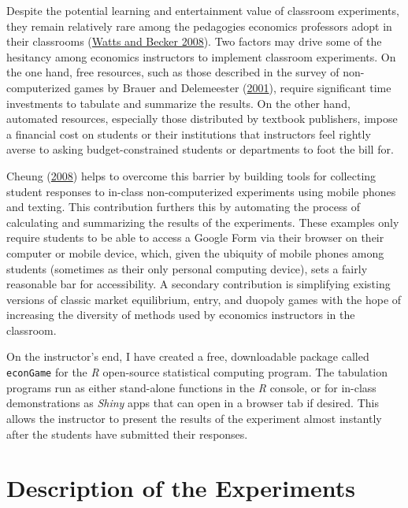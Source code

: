 \documentclass[
]{article}
\begin{document}
Despite the potential learning and entertainment value of classroom
experiments, they remain relatively rare among the pedagogies economics
professors adopt in their classrooms
(\protect\hyperlink{ref-watts_little_2008}{Watts and Becker 2008}). Two
factors may drive some of the hesitancy among economics instructors to
implement classroom experiments. On the one hand, free resources, such
as those described in the survey of non-computerized games by Brauer and
Delemeester (\protect\hyperlink{ref-brauer_games_2001}{2001}), require
significant time investments to tabulate and summarize the results. On
the other hand, automated resources, especially those distributed by
textbook publishers, impose a financial cost on students or their
institutions that instructors feel rightly averse to asking
budget-constrained students or departments to foot the bill for.

Cheung (\protect\hyperlink{ref-cheung_using_2008}{2008}) helps to
overcome this barrier by building tools for collecting student responses
to in-class non-computerized experiments using mobile phones and
texting. This contribution furthers this by automating the process of
calculating and summarizing the results of the experiments. These
examples only require students to be able to access a Google Form via
their browser on their computer or mobile device, which, given the
ubiquity of mobile phones among students (sometimes as their only
personal computing device), sets a fairly reasonable bar for
accessibility. A secondary contribution is simplifying existing versions
of classic market equilibrium, entry, and duopoly games with the hope of
increasing the diversity of methods used by economics instructors in the
classroom.

On the instructor's end, I have created a free, downloadable package
called \texttt{econGame} for the \emph{R} open-source statistical
computing program. The tabulation programs run as either stand-alone
functions in the \emph{R} console, or for in-class demonstrations as
\emph{Shiny} apps that can open in a browser tab if desired. This allows
the instructor to present the results of the experiment almost instantly
after the students have submitted their responses.

\hypertarget{description-of-the-experiments}{%
\section{Description of the
Experiments}\label{description-of-the-experiments}}
\end{document}
